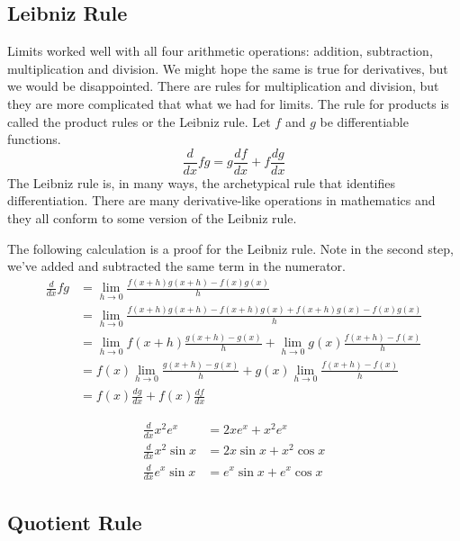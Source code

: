 \documentclass[fleqn]{report}
\begin{document}
\subsection{Leibniz Rule}
\label{leibniz-rule}

Limits worked well with all four arithmetic operations:
addition, subtraction, multiplication and division. We might
hope the same is true for derivatives, but we would be
disappointed. There are rules for multiplication and division,
but they are more complicated that what we had for limits.
The rule for products is called the product rules or the
Leibniz rule. Let $f$ and $g$ be differentiable functions.
\begin{equation*}
\frac{d}{dx} fg = g \frac{df}{dx} + f \frac{dg}{dx} 
\end{equation*}
The Leibniz rule is, in many ways, the archetypical rule that
identifies differentiation. There are many derivative-like
operations in mathematics and they all conform to some version
of the Leibniz rule. 

The following calculation is a proof for the Leibniz rule.
Note in the second step, we've added and subtracted the same
term in the numerator.
\begin{align*}
\frac{d}{dx} fg & = \lim_{h \rightarrow 0} \frac{f(x+h)g(x+h) -
f(x)g(x)}{h} \\
& = \lim_{h \rightarrow 0} \frac{f(x+h)g(x+h) - f(x+h) g(x) +
f(x+h) g(x) - f(x)g(x)}{h} \\
& = \lim_{h \rightarrow 0} f(x+h)\frac{g(x+h) - g(x)}{h} +
\lim_{h \rightarrow 0} g(x) \frac{f(x+h) - f(x)}{h} \\
& = f(x) \lim_{h \rightarrow 0} \frac{g(x+h) - g(x)}{h} +
g(x) \lim_{h \rightarrow 0} \frac{f(x+h) - f(x)}{h} \\
& = f(x) \frac{dg}{dx} + f(x) \frac{df}{dx}
\end{align*}

\begin{example}
\begin{align*}
\frac{d}{dx} x^2 e^x & = 2x e^x + x^2 e^x \\
\frac{d}{dx} x^2 \sin x & = 2x \sin x + x^2 \cos x \\
\frac{d}{dx} e^x \sin x & = e^x \sin x + e^x \cos x 
\end{align*}
\end{example}

\subsection{Quotient Rule}
\label{quotient-rule}
\end{document}

